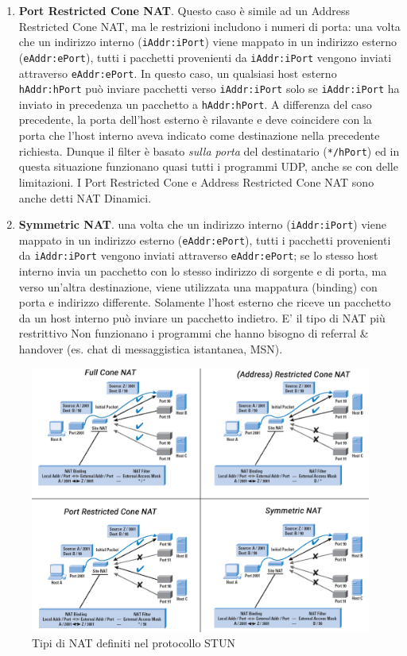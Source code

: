 \begin{enumerate}
	\item \textbf{Port Restricted Cone NAT}. Questo caso è simile ad un Address Restricted Cone NAT, ma le restrizioni includono i numeri di porta: una volta che un indirizzo interno (\texttt{iAddr:iPort}) viene mappato in un indirizzo esterno (\texttt{eAddr:ePort}), tutti i pacchetti provenienti da \texttt{iAddr:iPort} vengono inviati attraverso \texttt{eAddr:ePort}. In questo caso, un qualsiasi host esterno \texttt{hAddr:hPort} può inviare pacchetti verso \texttt{iAddr:iPort} solo se \texttt{iAddr:iPort} ha inviato in precedenza un pacchetto a \texttt{hAddr:hPort}. A differenza del caso precedente, la porta dell'host esterno è rilavante e deve coincidere con la porta che l'host interno aveva indicato come destinazione nella precedente richiesta. Dunque il filter è basato \textit{sulla porta} del destinatario (\texttt{*/hPort}) ed in questa situazione funzionano quasi tutti i programmi UDP, anche se con delle limitazioni. I Port Restricted Cone e Address Restricted Cone NAT sono anche detti NAT Dinamici.
	
	\item \textbf{Symmetric NAT}. una volta che un indirizzo interno (\texttt{iAddr:iPort}) viene mappato in un indirizzo esterno (\texttt{eAddr:ePort}), tutti i pacchetti provenienti da \texttt{iAddr:iPort} vengono inviati attraverso \texttt{eAddr:ePort}; se lo stesso host interno invia un pacchetto con lo stesso indirizzo di sorgente e di porta, ma verso un'altra destinazione, viene utilizzata una mappatura (binding) con porta e indirizzo differente. Solamente l'host esterno che riceve un pacchetto da un host interno può inviare un pacchetto indietro. E' il tipo di NAT più restrittivo Non funzionano i programmi che hanno bisogno di referral \& handover (es. chat di messaggistica istantanea, MSN).	
\end{enumerate}
\begin{figure}[htbp]
	\centering
	\includegraphics[scale = 0.4]{images/nat_types.png}
	\caption{Tipi di NAT definiti nel protocollo STUN}
	\label{img:NAT_Types}
\end{figure}

